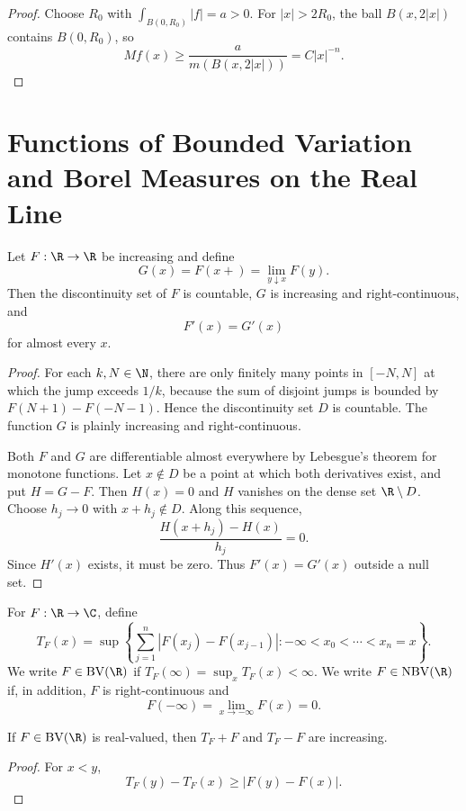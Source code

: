 \begin{proof}
Choose $R_0$ with $\int_{B(0,R_0)}|f|=a>0$. For $|x|>2R_0$, the ball $B(x,2|x|)$ contains $B(0,R_0)$, so
\[
Mf(x)\geq\frac{a}{m(B(x,2|x|))}=C|x|^{-n}.
\]
\end{proof}

\section{Functions of Bounded Variation and Borel Measures on the Real Line}

\begin{prop}
Let $F:\R\to\R$ be increasing and define
\[
G(x)=F(x+)=\lim_{y\downarrow x}F(y).
\]
Then the discontinuity set of $F$ is countable, $G$ is increasing and right-continuous, and
\[
F'(x)=G'(x)
\]
for almost every $x$.
\end{prop}

\begin{proof}
For each $k,N\in\N$, there are only finitely many points in $[-N,N]$ at which the jump exceeds $1/k$, because the sum of disjoint jumps is bounded by $F(N+1)-F(-N-1)$. Hence the discontinuity set $D$ is countable. The function $G$ is plainly increasing and right-continuous.

Both $F$ and $G$ are differentiable almost everywhere by Lebesgue's theorem for monotone functions. Let $x\notin D$ be a point at which both derivatives exist, and put $H=G-F$. Then $H(x)=0$ and $H$ vanishes on the dense set $\R\setminus D$. Choose $h_j\to0$ with $x+h_j\notin D$. Along this sequence,
\[
\frac{H(x+h_j)-H(x)}{h_j}=0.
\]
Since $H'(x)$ exists, it must be zero. Thus $F'(x)=G'(x)$ outside a null set.
\end{proof}

\begin{de}
For $F:\R\to\C$, define
\[
T_F(x)=\sup\left\{\sum_{j=1}^n|F(x_j)-F(x_{j-1})|:
-\infty<x_0<\cdots<x_n=x\right\}.
\]
We write $F\in\BV(\R)$ if $T_F(\infty)=\sup_xT_F(x)<\infty$. We write $F\in\NBV(\R)$ if, in addition, $F$ is right-continuous and
\[
F(-\infty)=\lim_{x\to-\infty}F(x)=0.
\]
\end{de}

\begin{lem}
If $F\in\BV(\R)$ is real-valued, then $T_F+F$ and $T_F-F$ are increasing.
\end{lem}

\begin{proof}
For $x<y$,
\[
T_F(y)-T_F(x)\geq|F(y)-F(x)|.
\]
\end{proof}

